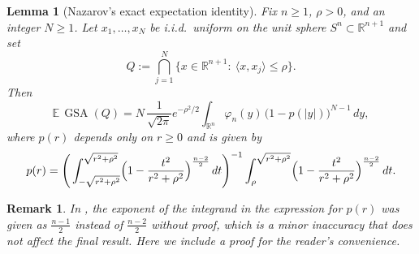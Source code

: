 \documentclass[11pt]{article}
\newtheorem{remark}[theorem]{Remark}
\newtheorem{lemma}[theorem]{Lemma}
\begin{document}
\begin{lemma}[Nazarov's exact expectation identity]\label{lem:ExpGSA}
Fix $n\ge 1$, $\rho>0$, and an integer $N\ge 1$.
Let $x_1,\dots,x_N$ be i.i.d.\ uniform on the unit sphere $S^n\subset\mathbb{R}^{n+1}$ and set
\[
Q:=\bigcap_{j=1}^N\{x\in\mathbb{R}^{n+1}:\ \langle x,x_j\rangle\le \rho\}.
\]
Then
\begin{equation}\label{eq:ExpGSA}
\mathbb{E}\,\operatorname{GSA}(Q)
=
N\,\frac{1}{\sqrt{2\pi}}e^{-\rho^2/2}
\int_{\mathbb{R}^n}\varphi_n(y)\,\bigl(1-p(|y|)\bigr)^{N-1}\,dy,
\end{equation}
where $p(r)$ depends only on $r\ge 0$ and is given by
\begin{equation}\label{eq:p_exact}
p(r)=
\Bigg(\int_{-\sqrt{r^2+\rho^2}}^{\sqrt{r^2+\rho^2}}
\Bigl(1-\frac{t^2}{r^2+\rho^2}\Bigr)^{\frac{n-2}{2}}\,dt\Bigg)^{-1}
\int_{\rho}^{\sqrt{r^2+\rho^2}}
\Bigl(1-\frac{t^2}{r^2+\rho^2}\Bigr)^{\frac{n-2}{2}}\,dt .
\end{equation}
\end{lemma}
\begin{remark}
In \cite{Nazarov2003}, the exponent of the integrand in the expression for $p(r)$ was given as $\frac{n-1}{2}$ instead of $\frac{n-2}{2}$ without proof, which is a minor inaccuracy that does not affect the final result. Here we include a proof for the reader's convenience.
\end{remark}
\end{document}
